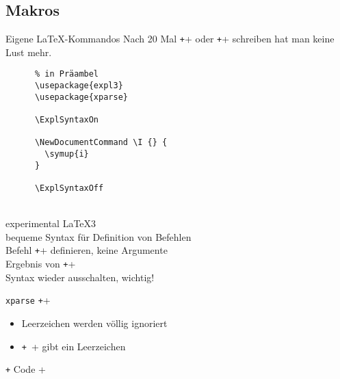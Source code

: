 \subsection{Makros}

\begin{frame}[fragile]{Eigene \LaTeX-Kommandos}
  Nach 20 Mal \texttt++ oder \texttt++ schreiben hat man keine Lust mehr.

  \vspace{2em}
  \begin{CodeExplanation}{0.45}
    \begin{verbatim}
      % in Präambel
      \usepackage{expl3}
      \usepackage{xparse}

      \ExplSyntaxOn

      \NewDocumentCommand \I {} {
        \symup{i}
      }

      \ExplSyntaxOff
    \end{verbatim}
  \Explanation
    \strut \\[0.5\baselineskip]
    experimental \LaTeX3 \\[2\baselineskip]
    bequeme Syntax für Definition von Befehlen \\[1\baselineskip]
    Befehl \texttt+\I+ definieren, keine Argumente \\
    Ergebnis von \texttt+\I+ \\[2\baselineskip]
    Syntax wieder ausschalten, wichtig!
  \end{CodeExplanation}
\end{frame}

\begin{frame}[fragile]{
  \texttt{xparse}
  \hfill
}
  \texttt+\ExplSyntaxOn+
  \begin{itemize}
    \item Leerzeichen werden völlig ignoriert
    \item \texttt+~+ gibt ein Leerzeichen
  \end{itemize}

  \texttt+\NewDocumentCommand {} { Code }+
\end{frame}

